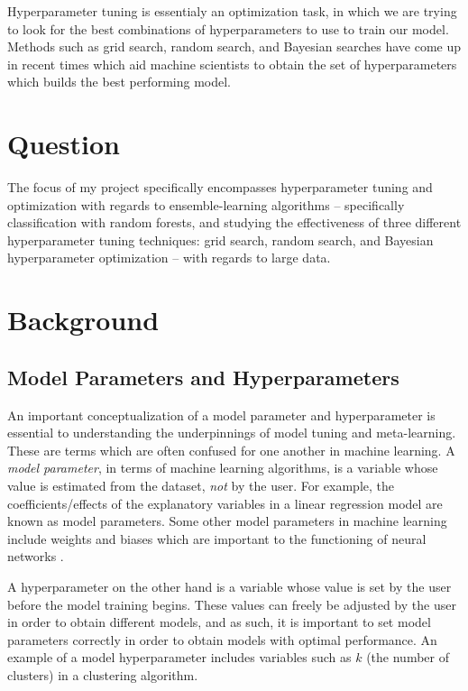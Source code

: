 \documentclass[12pt]{article}
\begin{document}
Hyperparameter tuning is essentialy an optimization task, in which we
are trying to look for the best combinations of hyperparameters to use
to train our model. Methods such as grid search, random search, and
Bayesian searches have come up in recent times which aid machine
scientists to obtain the set of hyperparameters which builds the best
performing model.

\hypertarget{question}{%
\section{Question}\label{question}}

\label{sec:question}

The focus of my project specifically encompasses hyperparameter tuning
and optimization with regards to ensemble-learning algorithms --
specifically classification with random forests, and studying the
effectiveness of three different hyperparameter tuning techniques: grid
search, random search, and Bayesian hyperparameter optimization -- with
regards to large data.

\hypertarget{background}{%
\section{Background}\label{background}}

\label{sec:background}

\hypertarget{model-parameters-and-hyperparameters}{%
\subsection{Model Parameters and
Hyperparameters}\label{model-parameters-and-hyperparameters}}

\label{sec:param_hyperparam}

An important conceptualization of a model parameter and hyperparameter
is essential to understanding the underpinnings of model tuning and
meta-learning. These are terms which are often confused for one another
in machine learning. A \emph{model parameter}, in terms of machine
learning algorithms, is a variable whose value is estimated from the
dataset, \emph{not} by the user. For example, the coefficients/effects
of the explanatory variables in a linear regression model are known as
model parameters. Some other model parameters in machine learning
include weights and biases which are important to the functioning of
neural networks \citep{Yang2020}.

A hyperparameter on the other hand is a variable whose value is set by
the user before the model training begins. These values can freely be
adjusted by the user in order to obtain different models, and as such,
it is important to set model parameters correctly in order to obtain
models with optimal performance. An example of a model hyperparameter
includes variables such as \(k\) (the number of clusters) in a
clustering algorithm.
\end{document}
